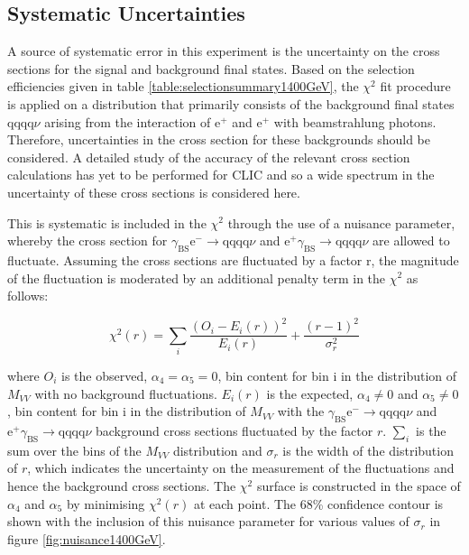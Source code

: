 
\subsection{Systematic Uncertainties}
A source of systematic error in this experiment is the uncertainty on the cross sections for the signal and background final states.  Based on the selection efficiencies given in table \ref{table:selectionsummary1400GeV}, the $\chi^{2}$ fit procedure is applied on a distribution that primarily consists of the background final states $\text{qqqq}\nu$ arising from the interaction of $\text{e}^{+}$ and $\text{e}^{+}$ with beamstrahlung photons.  Therefore, uncertainties in the cross section for these backgrounds should be considered.  A detailed study of the accuracy of the relevant cross section calculations has yet to be performed for CLIC and so a wide spectrum in the uncertainty of these cross sections is considered here.   

This is systematic is included in the $\chi^{2}$ through the use of a nuisance parameter, whereby the cross section for $\gamma_{\text{BS}}\text{e}^{-} \rightarrow \text{qqqq}\nu$ and $\text{e}^{+}\gamma_{\text{BS}} \rightarrow \text{qqqq}\nu$ are allowed to fluctuate.  Assuming the cross sections are fluctuated by a factor r, the magnitude of the fluctuation is moderated by an additional penalty term in the $\chi^{2}$ as follows:

\begin{equation}
\chi^{2}(r) = \sum_{i} \frac{(O_{i} - E_{i}(r))^{2}}{E_{i}(r)} + \frac{(r-1)^{2}}{\sigma_{r}^{2}} 
\end{equation}

where $O_{i}$ is the observed, $\alpha_{4} = \alpha_{5} = 0$, bin content for bin i in the distribution of $M_{VV}$ with no background fluctuations.  $E_{i}(r)$ is the expected, $\alpha_{4} \neq 0$ and $\alpha_{5} \neq 0$, bin content for bin i in the distribution of $M_{VV}$ with the $\gamma_{\text{BS}}\text{e}^{-} \rightarrow \text{qqqq}\nu$ and $\text{e}^{+}\gamma_{\text{BS}} \rightarrow \text{qqqq}\nu$ background cross sections fluctuated by the factor $r$.  $\sum_{i}$ is the sum over the bins of the $M_{VV}$ distribution and $\sigma_{r}$ is the width of the distribution of $r$, which indicates the uncertainty on the measurement of the fluctuations and hence the background cross sections.  The $\chi^{2}$ surface is constructed in the space of $\alpha_{4}$ and $\alpha_{5}$ by minimising $\chi^{2}(r)$ at each point.  The 68\% confidence contour is shown with the inclusion of this nuisance parameter for various values of $\sigma_{r}$ in figure \ref{fig:nuisance1400GeV}.   

